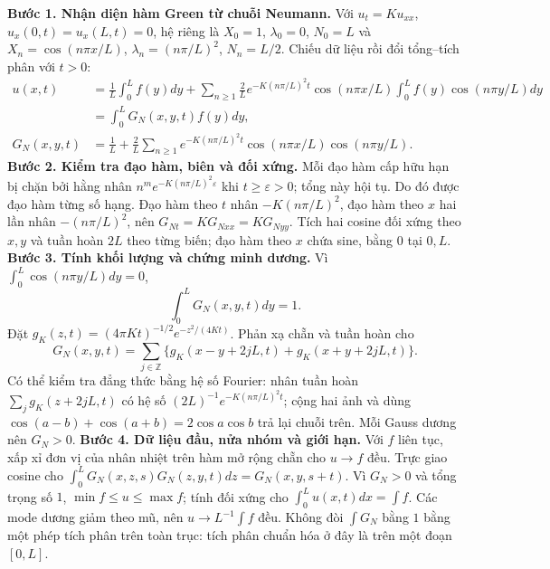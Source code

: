 \textbf{Bước 1. Nhận diện hàm Green từ chuỗi Neumann.}
Với $u_t=Ku_{xx}$, $u_x(0,t)=u_x(L,t)=0$, hệ riêng là $X_0=1$, $\lambda_0=0$, $N_0=L$ và $X_n=\cos(n\pi x/L)$, $\lambda_n=(n\pi/L)^2$, $N_n=L/2$. Chiếu dữ liệu rồi đổi tổng–tích phân với $t>0$:
\begin{align*}
u(x,t)&=\frac1L\int_0^Lf(y)dy+
\sum_{n\ge1}\frac2L e^{-K(n\pi/L)^2t}\cos(n\pi x/L)\int_0^Lf(y)\cos(n\pi y/L)dy\\
&=\int_0^LG_N(x,y,t)f(y)dy,\\
G_N(x,y,t)&=\frac1L+\frac2L\sum_{n\ge1}e^{-K(n\pi/L)^2t}
\cos(n\pi x/L)\cos(n\pi y/L).
\end{align*}
\textbf{Bước 2. Kiểm tra đạo hàm, biên và đối xứng.}
Mỗi đạo hàm cấp hữu hạn bị chặn bởi hằng nhân $n^m e^{-K(n\pi/L)^2\varepsilon}$ khi $t\ge\varepsilon>0$; tổng này hội tụ. Do đó được đạo hàm từng số hạng. Đạo hàm theo $t$ nhân $-K(n\pi/L)^2$, đạo hàm theo $x$ hai lần nhân $-(n\pi/L)^2$, nên $G_{Nt}=KG_{Nxx}=KG_{Nyy}$. Tích hai cosine đối xứng theo $x,y$ và tuần hoàn $2L$ theo từng biến; đạo hàm theo $x$ chứa sine, bằng $0$ tại $0,L$.
\textbf{Bước 3. Tính khối lượng và chứng minh dương.} Vì $\int_0^L\cos(n\pi y/L)dy=0$,
\[\int_0^LG_N(x,y,t)dy=1.\]
Đặt $g_K(z,t)=(4\pi Kt)^{-1/2}e^{-z^2/(4Kt)}$. Phản xạ chẵn và tuần hoàn cho
\[G_N(x,y,t)=\sum_{j\in\mathbb Z}\{g_K(x-y+2jL,t)+g_K(x+y+2jL,t)\}.\]
Có thể kiểm tra đẳng thức bằng hệ số Fourier: nhân tuần hoàn $\sum_jg_K(z+2jL,t)$ có hệ số $(2L)^{-1}e^{-K(n\pi/L)^2t}$; cộng hai ảnh và dùng $\cos(a-b)+\cos(a+b)=2\cos a\cos b$ trả lại chuỗi trên. Mỗi Gauss dương nên $G_N>0$.
\textbf{Bước 4. Dữ liệu đầu, nửa nhóm và giới hạn.} Với $f$ liên tục, xấp xỉ đơn vị của nhân nhiệt trên hàm mở rộng chẵn cho $u\to f$ đều. Trực giao cosine cho $\int_0^LG_N(x,z,s)G_N(z,y,t)dz=G_N(x,y,s+t)$. Vì $G_N>0$ và tổng trọng số $1$, $\min f\le u\le\max f$; tính đối xứng cho $\int_0^Lu(x,t)dx=\int f$. Các mode dương giảm theo mũ, nên $u\to L^{-1}\int f$ đều. Không đòi $\int G_N$ bằng $1$ bằng một phép tích phân trên toàn trục: tích phân chuẩn hóa ở đây là trên một đoạn $[0,L]$.
